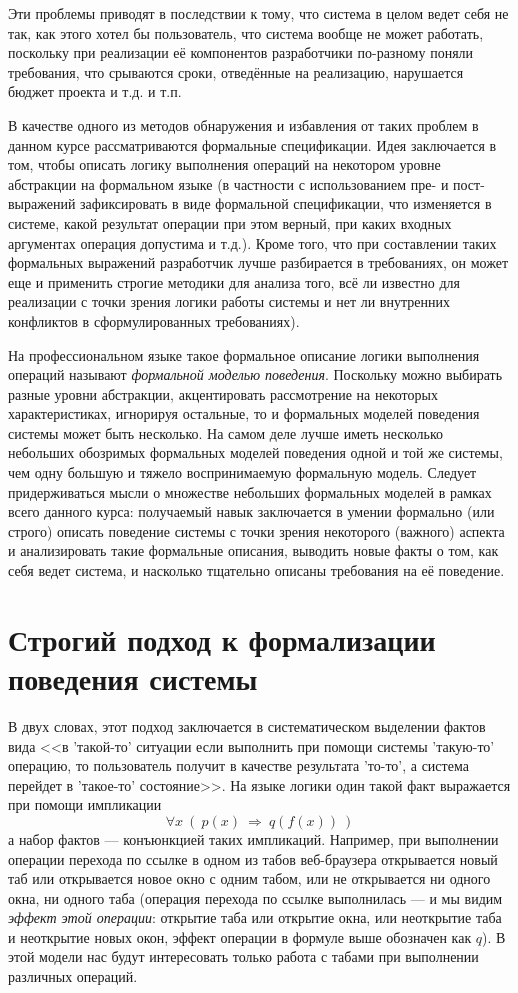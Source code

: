 \documentclass[14pt, twoside]{extreport}
\begin{document}
Эти проблемы приводят в последствии к тому, что система в целом ведет себя не так, как этого хотел бы пользователь, что система вообще не может работать, поскольку при реализации её компонентов разработчики по-разному поняли требования, что срываются сроки, отведённые на реализацию, нарушается бюджет проекта и т.д. и т.п.

В качестве одного из методов обнаружения и избавления от таких проблем в данном курсе рассматриваются формальные спецификации. Идея заключается в том, чтобы описать логику выполнения операций на некотором уровне абстракции на формальном языке (в частности с использованием пре- и пост- выражений зафиксировать в виде формальной спецификации, что изменяется в системе, какой результат операции при этом верный, при каких входных аргументах операция допустима и т.д.). Кроме того, что при составлении таких формальных выражений разработчик лучше разбирается в требованиях, он может еще и применить строгие методики для анализа того, всё ли известно для реализации с точки зрения логики работы системы и нет ли внутренних конфликтов в сформулированных требованиях).

На профессиональном языке такое формальное описание логики выполнения операций называют \emph{формальной моделью поведения}. Поскольку можно выбирать разные уровни абстракции, акцентировать рассмотрение на некоторых характеристиках, игнорируя остальные, то и формальных моделей поведения системы может быть несколько. На самом деле лучше иметь несколько небольших обозримых формальных моделей поведения одной и той же системы, чем одну большую и тяжело воспринимаемую формальную модель. Следует придерживаться мысли о множестве небольших формальных моделей в рамках всего данного курса: получаемый навык заключается в умении формально (или строго) описать поведение системы с точки зрения некоторого (важного) аспекта и анализировать такие формальные описания, выводить новые факты о том, как себя ведет система, и насколько тщательно описаны требования на её поведение.

\section{Строгий подход к формализации поведения системы}

В двух словах, этот подход заключается в систематическом выделении фактов вида <<в 'такой-то' ситуации если выполнить при помощи системы 'такую-то' операцию, то пользователь получит в качестве результата 'то-то', а система перейдет в 'такое-то' состояние>>. На языке логики один такой факт выражается при помощи импликации $$\forall x~ ( ~p(x)~ \Rightarrow ~q(f(x)) ~)$$ а набор фактов --- конъюнкцией таких импликаций. Например, при выполнении операции перехода по ссылке в одном из табов веб-браузера открывается новый таб или открывается новое окно с одним табом, или не открывается ни одного окна, ни одного таба (операция перехода по ссылке выполнилась --- и мы видим \emph{эффект этой операции}: открытие таба или открытие окна, или неоткрытие таба и неоткрытие новых окон, эффект операции в формуле выше обозначен как $q$). В этой модели нас будут интересовать только работа с табами при выполнении различных операций.
\end{document}

